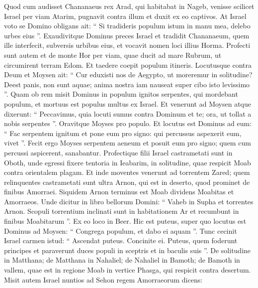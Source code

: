 \begin{biblechapter}
\begin{biblechapter}
\begin{biblechapter}
\begin{biblechapter}
\begin{biblechapter}
\begin{biblechapter}
\begin{biblechapter}
\begin{biblechapter}
\begin{biblechapter}
\begin{biblechapter}
\begin{biblechapter}
\begin{biblechapter}
\begin{biblechapter}
\begin{biblechapter}
\begin{biblechapter}
\begin{biblechapter}
\begin{biblechapter}
\begin{biblechapter}
\begin{biblechapter}
\begin{biblechapter}
\begin{biblechapter}
\verse Quod cum audisset Chananaeus rex Arad, qui habitabat in Nageb, venisse scilicet Israel per viam Atarim, pugnavit contra illum et duxit ex eo captivos. 
\verse At Israel voto se Domino obligans ait: “ Si tradideris populum istum in manu mea, delebo urbes eius ”. 
\verse Exaudivitque Dominus preces Israel et tradidit Chananaeum, quem ille interfecit, subversis urbibus eius, et vocavit nomen loci illius Horma.
 \verse Profecti sunt autem et de monte Hor per viam, quae ducit ad mare Rubrum, ut circumirent terram Edom. Et taedere coepit populum itineris. 
\verse Locutusque contra Deum et Moysen ait: “ Cur eduxisti nos de Aegypto, ut moreremur in solitudine? Deest panis, non sunt aquae; anima nostra iam nauseat super cibo isto levissimo ”.
 \verse Quam ob rem misit Dominus in populum ignitos serpentes, qui mordebant populum, et mortuus est populus multus ex Israel. 
\verse Et venerunt ad Moysen atque dixerunt: “ Peccavimus, quia locuti sumus contra Dominum et te; ora, ut tollat a nobis serpentes ”. Oravitque Moyses pro populo. 
\verse Et locutus est Dominus ad eum: “ Fac serpentem ignitum et pone eum pro signo: qui percussus aspexerit eum, vivet ”. 
\verse Fecit ergo Moyses serpentem aeneum et posuit eum pro signo; quem cum percussi aspicerent, sanabantur.
 \verse Profectique filii Israel castrametati sunt in Oboth, 
\verse unde egressi fixere tentoria in Ieabarim, in solitudine, quae respicit Moab contra orientalem plagam. 
\verse Et inde moventes venerunt ad torrentem Zared; 
\verse quem relinquentes castrametati sunt ultra Arnon, qui est in deserto, quod prominet de finibus Amorraei. Siquidem Arnon terminus est Moab dividens Moabitas et Amorraeos. 
\verse Unde dicitur in libro bellorum Domini:
 “ Vaheb in Supha
 et torrentes Arnon.
 \verse Scopuli torrentium inclinati sunt
 in habitationem Ar
 et recumbunt in finibus Moabitarum ”.
 \verse Ex eo loco in Beer. Hic est puteus, super quo locutus est Dominus ad Moysen: “ Congrega populum, et dabo ei aquam ”. 
\verse Tunc cecinit Israel carmen istud:
 “ Ascendat puteus. Concinite ei.
 \verse Puteus, quem foderunt principes
 et paraverunt duces populi
 in sceptris et in baculis suis ”.
 De solitudine in Matthana; 
\verse de Matthana in Nahaliel; de Nahaliel in Bamoth; 
\verse de Bamoth in vallem, quae est in regione Moab in vertice Phasga, qui respicit contra desertum.
 \verse Misit autem Israel nuntios ad Sehon regem Amorraeorum dicens: 

\end{biblechapter}
\end{biblechapter}
\end{biblechapter}
\end{biblechapter}
\end{biblechapter}
\end{biblechapter}
\end{biblechapter}
\end{biblechapter}
\end{biblechapter}
\end{biblechapter}
\end{biblechapter}
\end{biblechapter}
\end{biblechapter}
\end{biblechapter}
\end{biblechapter}
\end{biblechapter}
\end{biblechapter}
\end{biblechapter}
\end{biblechapter}
\end{biblechapter}
\end{biblechapter}
